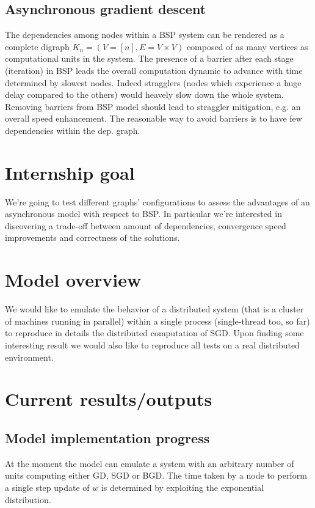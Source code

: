 \documentclass[a4paper,12pt]{article}
\theoremstyle{newplanestyle}
\theoremstyle{newdefinitionstyle}
\theoremstyle{newprovestyle}
\begin{document}
\subsection*{Asynchronous gradient descent}
The dependencies among nodes within a BSP system can be rendered as a complete digraph $K_n = (V=[n],E=V \times V)$ composed of as many vertices as computational units in the system. The presence of a barrier after each stage (iteration) in BSP leads the overall computation dynamic to advance with time determined by slowest nodes. Indeed stragglers (nodes which experience a huge delay compared to the others) would heavely slow down the whole system. Removing barriers from BSP model should lead to straggler mitigation, e.g. an overall speed enhancement. The reasonable way to avoid barriers is to have few dependencies within the dep. graph.

\section*{Internship goal}
We're going to test different graphs' configurations to assess the advantages of an asynchronous model with respect to BSP. In particular we're interested in discovering a trade-off between amount of dependencies, convergence speed improvements and correctness of the solutions. 


\section*{Model overview}
We would like to emulate the behavior of a distributed system (that is a cluster of  machines running in parallel) within a single process (single-thread too, so far) to reproduce in details the distributed computation of SGD. Upon finding some interesting result we would also like to reproduce all tests on a real distributed environment.


\section*{Current results/outputs}

\subsection*{Model implementation progress}
At the moment the model can emulate a system with an arbitrary number of units computing either GD, SGD or BGD. The time taken by a node to perform a single step update of $w$ is determined by exploiting the exponential distribution.
\end{document}
